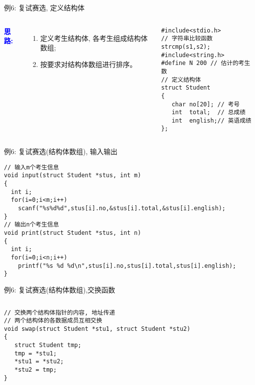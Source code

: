 \begin{frame}{例6: 复试赛选, 定义结构体}
\begin{columns}[T]
\textbf{\textcolor{blue}{思路:}}
\begin{enumerate}
	\item 定义考生结构体, 各考生组成结构体数组;
	\item 按要求对结构体数组进行排序。
\end{enumerate}
\begin{lstlisting}
#include<stdio.h>
// 字符串比较函数strcmp(s1,s2);
#include<string.h> 
#define N 200 // 估计的考生数
// 定义结构体
struct Student 
{ 
   char no[20]; // 考号
   int  total;  // 总成绩
   int  english;// 英语成绩
};
\end{lstlisting}
\end{columns}
\end{frame}

\begin{frame}{例6: 复试赛选(结构体数组), 输入输出}
\vspace{-0.4cm}
\begin{lstlisting}
// 输入m个考生信息
void input(struct Student *stus, int m) 
{
  int i;
  for(i=0;i<m;i++) 
    scanf("%s%d%d",stus[i].no,&stus[i].total,&stus[i].english); 
}
// 输出n个考生信息
void print(struct Student *stus, int n) 
{
  int i;
  for(i=0;i<n;i++) 
    printf("%s %d %d\n",stus[i].no,stus[i].total,stus[i].english); 
}
\end{lstlisting}
\end{frame}

\begin{frame}{例6: 复试赛选(结构体数组),交换函数}
\begin{columns}[T]
\begin{lstlisting}
// 交换两个结构体指针的内容, 地址传递
// 两个结构体的各数据成员互相交换 
void swap(struct Student *stu1, struct Student *stu2)
{
   struct Student tmp;
   tmp = *stu1; 
   *stu1 = *stu2;
   *stu2 = tmp;
}

\end{lstlisting}
\end{columns}
\medskip
\end{frame}


